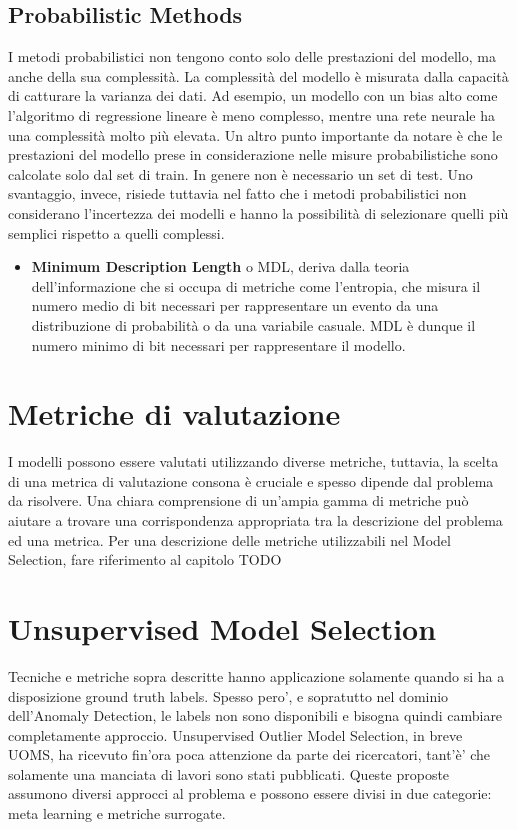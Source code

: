 \subsection{Probabilistic Methods}
I metodi probabilistici non tengono conto solo delle prestazioni del modello, ma anche della sua complessità. La complessità del modello è misurata dalla capacità di catturare la varianza dei dati. 
Ad esempio, un modello con un bias alto come l'algoritmo di regressione lineare è meno complesso, mentre una rete neurale ha una complessità molto più elevata.
Un altro punto importante da notare è che le prestazioni del modello prese in considerazione nelle misure probabilistiche sono calcolate solo dal set di train. In genere non è necessario un set di test.
Uno svantaggio, invece, risiede tuttavia nel fatto che i metodi probabilistici non considerano l'incertezza dei modelli e hanno la possibilità di selezionare  quelli più semplici rispetto a quelli complessi.
\begin{itemize}
\item \textbf{Minimum Description Length} o MDL, deriva dalla teoria dell'informazione che si occupa di metriche come l'entropia, che misura il numero medio di bit necessari per rappresentare un evento da una distribuzione di probabilità o da una variabile casuale. 
MDL è dunque il numero minimo di bit necessari per rappresentare il modello.
\end{itemize}

\section{Metriche di valutazione}
I modelli possono essere valutati utilizzando diverse metriche, tuttavia, la scelta di una metrica di valutazione consona è cruciale e spesso dipende dal problema da risolvere. Una chiara comprensione di un'ampia gamma di metriche può aiutare a trovare una corrispondenza appropriata tra la descrizione del problema ed una metrica.
Per una descrizione delle metriche utilizzabili nel Model Selection, fare riferimento al capitolo TODO

\section{Unsupervised Model Selection}
Tecniche e metriche sopra descritte hanno applicazione solamente quando si ha a disposizione ground truth labels. Spesso pero', e sopratutto nel dominio dell'Anomaly Detection, le labels non sono disponibili e bisogna quindi cambiare completamente approccio. 
Unsupervised Outlier Model Selection, in breve UOMS, ha ricevuto fin'ora poca attenzione da parte dei ricercatori, tant'è' che solamente una manciata di lavori sono stati pubblicati. Queste proposte assumono diversi approcci al problema e possono essere divisi in due categorie: meta learning e metriche surrogate.

